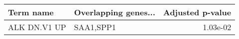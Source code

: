 \begin{tabular}{llr}
\toprule
   Term name & Overlapping genes... &  Adjusted p-value \\
\midrule
ALK DN.V1 UP &            SAA1,SPP1 &          1.03e-02 \\
\bottomrule
\end{tabular}
